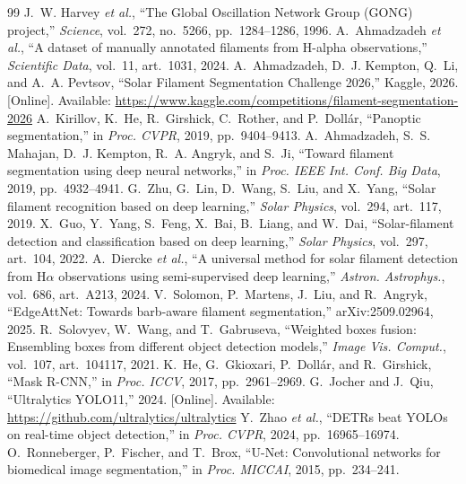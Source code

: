 \documentclass[conference]{IEEEtran}
\begin{document}
\begin{thebibliography}{99}
 J.~W. Harvey \emph{et al.}, ``The Global Oscillation Network Group (GONG) project,'' \emph{Science}, vol.~272, no.~5266, pp.~1284--1286, 1996.
 A.~Ahmadzadeh \emph{et al.}, ``A dataset of manually annotated filaments from H-alpha observations,'' \emph{Scientific Data}, vol.~11, art.~1031, 2024.
 A.~Ahmadzadeh, D.~J. Kempton, Q.~Li, and A.~A. Pevtsov, ``Solar Filament Segmentation Challenge 2026,'' Kaggle, 2026. [Online]. Available: \url{https://www.kaggle.com/competitions/filament-segmentation-2026}
 A.~Kirillov, K.~He, R.~Girshick, C.~Rother, and P.~Doll\'ar, ``Panoptic segmentation,'' in \emph{Proc. CVPR}, 2019, pp.~9404--9413.
 A.~Ahmadzadeh, S.~S. Mahajan, D.~J. Kempton, R.~A. Angryk, and S.~Ji, ``Toward filament segmentation using deep neural networks,'' in \emph{Proc. IEEE Int. Conf. Big Data}, 2019, pp.~4932--4941.
 G.~Zhu, G.~Lin, D.~Wang, S.~Liu, and X.~Yang, ``Solar filament recognition based on deep learning,'' \emph{Solar Physics}, vol.~294, art.~117, 2019.
 X.~Guo, Y.~Yang, S.~Feng, X.~Bai, B.~Liang, and W.~Dai, ``Solar-filament detection and classification based on deep learning,'' \emph{Solar Physics}, vol.~297, art.~104, 2022.
 A.~Diercke \emph{et al.}, ``A universal method for solar filament detection from H$\alpha$ observations using semi-supervised deep learning,'' \emph{Astron. Astrophys.}, vol.~686, art.~A213, 2024.
 V.~Solomon, P.~Martens, J.~Liu, and R.~Angryk, ``EdgeAttNet: Towards barb-aware filament segmentation,'' arXiv:2509.02964, 2025.
 R.~Solovyev, W.~Wang, and T.~Gabruseva, ``Weighted boxes fusion: Ensembling boxes from different object detection models,'' \emph{Image Vis. Comput.}, vol.~107, art.~104117, 2021.
 K.~He, G.~Gkioxari, P.~Doll\'ar, and R.~Girshick, ``Mask R-CNN,'' in \emph{Proc. ICCV}, 2017, pp.~2961--2969.
 G.~Jocher and J.~Qiu, ``Ultralytics YOLO11,'' 2024. [Online]. Available: \url{https://github.com/ultralytics/ultralytics}
 Y.~Zhao \emph{et al.}, ``DETRs beat YOLOs on real-time object detection,'' in \emph{Proc. CVPR}, 2024, pp.~16965--16974.
 O.~Ronneberger, P.~Fischer, and T.~Brox, ``U-Net: Convolutional networks for biomedical image segmentation,'' in \emph{Proc. MICCAI}, 2015, pp.~234--241.

\end{thebibliography}
\end{document}
